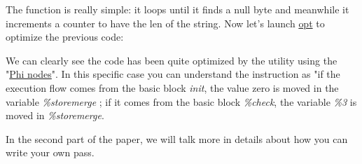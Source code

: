\documentclass[a4paper, 11pt, notitlepage]{report}
\begin{document}
The function is really simple: it loops until it finds a null byte and meanwhile it increments a counter to have the len of the string. Now let's launch \href{http://llvm.org/docs/CommandGuide/opt.html}{opt} to optimize the previous code:

We can clearly see the code has been quite optimized by the utility using the "\href{http://llvm.org/docs/LangRef.html#i-phi}{Phi nodes}". In this specific case you can understand the instruction as "if the execution flow comes from the basic block \textit{init}, the value zero is moved in the variable \textit{\%storemerge} ; if it comes from the basic block \textit{\%check}, the variable \textit{\%3} is moved in \textit{\%storemerge}.

In the second part of the paper, we will talk more in details about how you can write your own pass.
\end{document}
